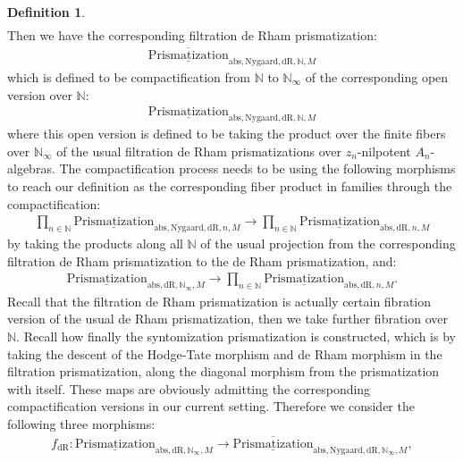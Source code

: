 \documentclass[12pt]{article}
\theoremstyle{definition}
\newtheorem{definition}{Definition}
\begin{document}
\begin{definition}
\begin{align}
\end{align}
Then we have the corresponding filtration de Rham prismatization:
\begin{align}
\overline{\underline{\mathrm{Prismatization}}}_{\mathrm{abs},\mathrm{Nygaard},\mathrm{dR},\mathbb{N},M}
\end{align}
which is defined to be compactification from $\mathbb{N}$ to $\mathbb{N}_\infty$ of the corresponding open version over $\mathbb{N}$:
\begin{align}
{\underline{\mathrm{Prismatization}}}_{\mathrm{abs},\mathrm{Nygaard},\mathrm{dR},\mathbb{N},M}
\end{align}
where this open version is defined to be taking the product over the finite fibers over $\mathbb{N}_\infty$ of the usual filtration de Rham prismatizations over $z_n$-nilpotent $A_n$-algebras. The compactification process needs to be using the following morphisms to reach our definition as the corresponding fiber product in families through the compactification:
\begin{align}
\prod_{n\in \mathbb{N}} {\underline{\mathrm{Prismatization}}}_{\mathrm{abs},\mathrm{Nygaard},\mathrm{dR},n,M}\rightarrow  \prod_{n\in \mathbb{N}} {\underline{\mathrm{Prismatization}}}_{\mathrm{abs},\mathrm{dR},n,M}
\end{align}
by taking the products along all $\mathbb{N}$ of the usual projection from the corresponding filtration de Rham prismatization to the de Rham prismatization, and:
\begin{align}
{\underline{\mathrm{Prismatization}}}_{\mathrm{abs},\mathrm{dR},\mathbb{N}_\infty,M}\rightarrow  \prod_{n\in \mathbb{N}} {\underline{\mathrm{Prismatization}}}_{\mathrm{abs},\mathrm{dR},n,M}.
\end{align}
Recall that the filtration de Rham prismatization is actually certain fibration version of the usual de Rham prismatization, then we take further fibration over $\mathbb{N}$. Recall how finally the syntomization prismatization is constructed, which is by taking the descent of the Hodge-Tate morphism and de Rham morphism in the filtration prismatization, along the diagonal morphism from the prismatization with itself. These maps are obviously admitting the corresponding compactification versions in our current setting. Therefore we consider the following three morphisms:
\begin{align}
f_\mathrm{dR}: {\underline{\mathrm{Prismatization}}}_{\mathrm{abs},\mathrm{dR},\mathbb{N}_\infty,M}\rightarrow \overline{\underline{\mathrm{Prismatization}}}_{\mathrm{abs},\mathrm{Nygaard},\mathrm{dR},\mathbb{N}_\infty,M},

\end{align}
\end{definition}
\end{document}
